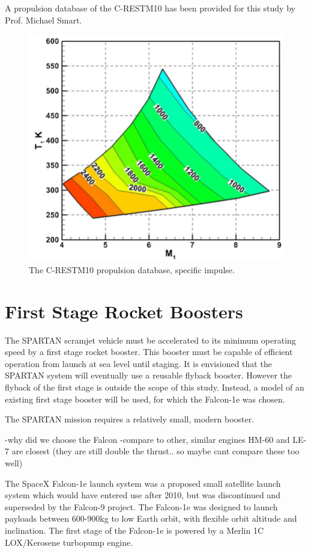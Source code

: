 A propulsion database of the C-RESTM10 has been provided for this study by Prof. Michael Smart.
\begin{figure}
\centering
\includegraphics[width=0.7\linewidth]{figures/2_literature-review/C-REST}
\caption{The C-RESTM10 propulsion database, specific impulse.}
\label{fig:C-REST}
\end{figure}



\section{First Stage Rocket Boosters}

The SPARTAN scramjet vehicle must be accelerated to its minimum operating speed by a first stage rocket booster. This booster must be capable of efficient operation from launch at sea level until staging. It is envisioned that the SPARTAN system will eventually use a reusable flyback booster\cite{Preller2017}. However the flyback of the first stage is outside the scope of this study. Instead, a model of an existing first stage booster will be used, for which the Falcon-1e was chosen.

The SPARTAN mission requires a relatively small, modern booster. 

-why did we choose the Falcon
-compare to other, similar engines HM-60 and LE-7 are closest (they are still double the thrust.. so maybe cant compare these too well)

The SpaceX Falcon-1e launch system was a proposed small satellite launch system which would have entered use after 2010\cite{Vehicle2008}, but was discontinued and superseded by the Falcon-9 project. The Falcon-1e was designed to launch payloads between 600-900kg to low Earth orbit, with flexible orbit altitude and inclination.  
The first stage of the Falcon-1e is powered by a Merlin 1C LOX/Kerosene turbopump engine.


